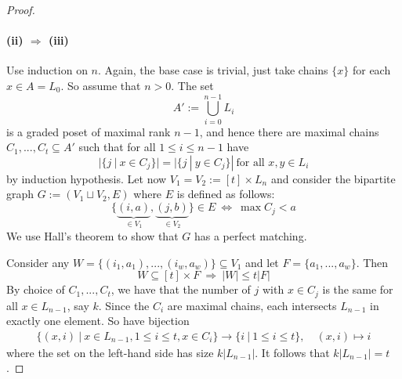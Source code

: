 \documentclass{scrartcl}
\theoremstyle{definition}
\begin{document}
\begin{proof}
    \paragraph{(ii) $\Rightarrow$ (iii)} Use induction on $n$.
    Again, the base case is trivial, just take chains $\{x\}$ for each $x \in A = L_0$.
    So assume that $n > 0$. The set
    \begin{equation*}
        A' := \bigcup_{i = 0}^{n - 1} L_i
    \end{equation*}
    is a graded poset of maximal rank $n - 1$, and hence there are maximal chains $C_1, ..., C_t \subseteq A'$ such that for all $1 \leq i \leq n - 1$ have
    \begin{equation*}
        |\{j \ | \ x \in C_j\}| = |\{j \ | \ y \in C_j\}| \ \text{for all $x, y \in L_i$}
    \end{equation*}
    by induction hypothesis.
    Let now $V_1 = V_2 := [t] \times L_n$ and consider the bipartite graph $G := (V_1 \sqcup V_2, E)$ where $E$ is defined as follows:
    \begin{equation*}
        \{ \underbrace{(i, a)}_{\in V_1}, \underbrace{(j, b)}_{\in V_2} \} \in E \ \Leftrightarrow \ \max C_j < a
    \end{equation*}
    We use Hall's theorem to show that $G$ has a perfect matching.

    Consider any $W = \{ (i_1, a_1), ..., (i_w, a_w) \} \subseteq V_1$ and let $F = \{ a_1, ..., a_w \}$.
    Then
    \begin{equation*}
        W \subseteq [t] \times F \ \Rightarrow \ |W| \leq t|F|
    \end{equation*}
    By choice of $C_1, ..., C_t$, we have that the number of $j$ with $x \in C_j$ is the same for all $x \in L_{n - 1}$, say $k$.
    Since the $C_i$ are maximal chains, each intersects $L_{n - 1}$ in exactly one element.
    So have bijection
    \begin{align*}
        \{ (x, i) \ | \ x \in L_{n - 1}, 1 \leq i \leq t, x \in C_i\} \to \{ i \ | \ 1 \leq i \leq t \}, \quad (x, i) \mapsto i
    \end{align*}
    where the set on the left-hand side has size $k |L_{n - 1}|$. It follows that $k|L_{n - 1}| = t$.


\end{proof}
\end{document}
